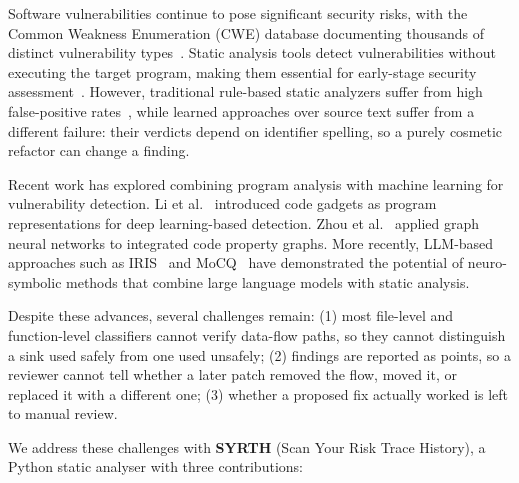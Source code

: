 \documentclass[12pt,a4paper]{article}
\begin{document}
Software vulnerabilities continue to pose significant security risks, with the Common Weakness Enumeration (CWE) database documenting thousands of distinct vulnerability types~\cite{cwe}. Static analysis tools detect vulnerabilities without executing the target program, making them essential for early-stage security assessment~\cite{sadowski2018lessons, distefano2019scaling}. However, traditional rule-based static analyzers suffer from high false-positive rates~\cite{pereira2021machine}, while learned approaches over source text suffer from a different failure: their verdicts depend on identifier spelling, so a purely cosmetic refactor can change a finding.

Recent work has explored combining program analysis with machine learning for vulnerability detection. Li et al.~\cite{li2018vuldeepecker} introduced code gadgets as program representations for deep learning-based detection. Zhou et al.~\cite{zhou2019devign} applied graph neural networks to integrated code property graphs. More recently, LLM-based approaches such as IRIS~\cite{li2024iris} and MoCQ~\cite{mocq2025} have demonstrated the potential of neuro-symbolic methods that combine large language models with static analysis.

Despite these advances, several challenges remain: (1) most file-level and function-level classifiers cannot verify data-flow paths, so they cannot distinguish a sink used safely from one used unsafely; (2) findings are reported as points, so a reviewer cannot tell whether a later patch removed the flow, moved it, or replaced it with a different one; (3) whether a proposed fix actually worked is left to manual review.

We address these challenges with \textbf{SYRTH} (Scan Your Risk Trace History), a Python static analyser with three contributions:
\end{document}
